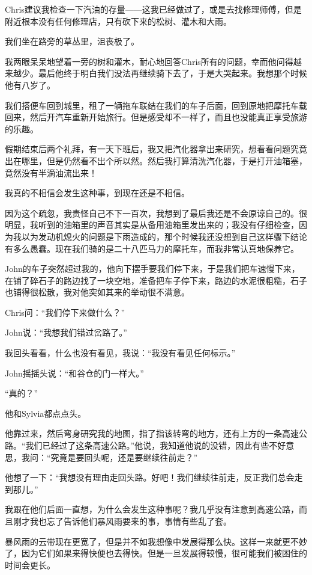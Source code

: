 \documentclass[UTF8]{article}
\begin{document}
\par Chris建议我检查一下汽油的存量——这我已经做过了，或是去找修理师傅，但是附近根本没有任何修理店，只有砍下来的松树、灌木和大雨。
\par 我们坐在路旁的草丛里，沮丧极了。
\par 我两眼呆呆地望着一旁的树和灌木，耐心地回答Chris所有的问题，幸而他问得越来越少。最后他终于明白我们没法再继续骑下去了，于是大哭起来。我想那个时候他有八岁了。
\par 我们搭便车回到城里，租了一辆拖车联结在我们的车子后面，回到原地把摩托车载回来，然后开汽车重新开始旅行。但是感受却不一样了，而且也没能真正享受旅游的乐趣。
\par 假期结束后两个礼拜，有一天下班后，我又把汽化器拿出来研究，想看看问题究竟出在哪里，但是仍然看不出个所以然。然后我打算清洗汽化器，于是打开油箱塞，竟然没有半滴油流出来！
\par 我真的不相信会发生这种事，到现在还是不相信。
\par 因为这个疏忽，我责怪自己不下一百次，我想到了最后我还是不会原谅自己的。很明显，我听到的油箱里的声音其实是从备用油箱里发出来的；我没有仔细检查，因为我以为发动机熄火的问题是下雨造成的，那个时候我还没想到自己这样骤下结论有多么愚蠢。现在我们骑的是二十八匹马力的摩托车，而我非常认真地保养它。
\par John的车子突然超过我的，他向下摆手要我们停下来，于是我们把车速慢下来，在铺了碎石子的路边找了一块空地，准备把车子停下来，路边的水泥很粗糙，石子也铺得很松散，我对他突如其来的举动很不满意。
\par Chris问：“我们停下来做什么？”
\par John说：“我想我们错过岔路了。”
\par 我回头看看，什么也没有看见，我说：“我没有看见任何标示。”
\par John摇摇头说：“和谷仓的门一样大。”
\par “真的？”
\par 他和Sylvia都点点头。
\par 他靠过来，然后弯身研究我的地图，指了指该转弯的地方，还有上方的一条高速公路。“我们已经过了这条高速公路。”他说，我知道他说的没错，因此有些不好意思，我问：“究竟是要回头呢，还是要继续往前走？”
\par 他想了一下：“我想没有理由走回头路。好吧！我们继续往前走，反正我们总会走到那儿。”
\par 我跟在他们后面一直想，为什么会发生这种事呢？我几乎没有注意到高速公路，而且刚才我也忘了告诉他们暴风雨要来的事，事情有些乱了套。
\par 暴风雨的云带现在更宽了，但是并不如我想像中发展得那么快。这样一来就更不妙了，因为它们如果来得快便也去得快。但是一旦发展得较慢，很可能我们被困住的时间会更长。
\end{document}
